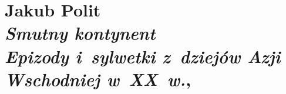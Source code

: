 \documentclass[a4paper,11pt]{article}
\numberwithin{equation}{section}
\begin{document}
\newpage

\section{ %
  Jakub Polit \\
  \textit{Smutny kontynent} \\
  \textit{Epizody i~sylwetki z~dziejów Azji Wschodniej w~XX~w.},
  \cite{PolitSmutnyKontynent2021}}









\VerSpaceFive
\end{document}
